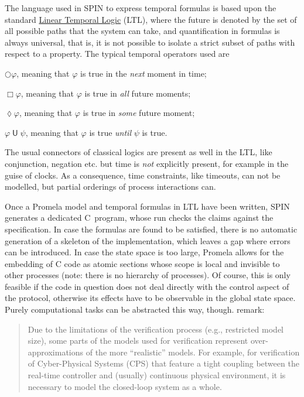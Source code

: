 \documentclass[a4paper,11pt,twoside]{article}
\newcommand\SPIN{\textsf{SPIN}\xspace}
\newcommand\Promela{\textsf{Promela}\xspace}
\newcommand\Clang{\textsf{C}\xspace}
\begin{document}
The language used in \SPIN to express temporal formulas is based upon
the standard
\href{http://en.wikipedia.org/wiki/Linear_temporal_logic}{Linear
  Temporal Logic} (LTL), where the future is denoted by the set of all
possible paths that the system can take, and quantification in
formulas is always universal, that is, it is not possible to isolate a
strict subset of paths with respect to a property. The typical
temporal operators used are
\begin{itemize*}

  \item $\bigcirc \varphi$, meaning that $\varphi$ is true in the
    \emph{next} moment in time;

  \item $\Box \varphi$, meaning that $\varphi$ is true in \emph{all}
    future moments;

  \item $\lozenge \varphi$, meaning that $\varphi$ is true in
    \emph{some} future moment;

  \item $\varphi \mathrel{\textsf{U}} \psi$, meaning that $\varphi$ is
    true \emph{until} $\psi$ is true.
 
\end{itemize*}
The usual connectors of classical logics are present as well in the
LTL, like conjunction, negation etc. but time is \emph{not} explicitly
present, for example in the guise of clocks. As a consequence, time
constraints, like timeouts, can not be modelled, but partial orderings
of process interactions can.

Once a \Promela model and temporal formulas in LTL have been written,
\SPIN generates a dedicated \Clang~program, whose run checks the
claims against the specification. In case the formulas are found to be
satisfied, there is no automatic generation of a skeleton of the
implementation, which leaves a gap where errors can be introduced. In
case the state space is too large, \Promela allows for the embedding
of \Clang code as atomic sections whose scope is local and invisible
to other processes (note: there is no hierarchy of processes). Of
course, this is only feasible if the code in question does not deal
directly with the control aspect of the protocol, otherwise its
effects have to be observable in the global state space. Purely
computational tasks can be abstracted this way,
though. \citet{PajicJiangLeeSokolskyMangharam:2012} remark: \blockquote{Due to the limitations of the verification
  process (e.g., restricted model size), some parts of the models used
  for verification represent over\hyp{}approximations of the more
  ``realistic'' models. For example, for verification of
  Cyber\hyp{}Physical Systems (CPS) that feature a tight coupling
  between the real\hyp{}time controller and (usually) continuous
  physical environment, it is necessary to model the closed-loop
  system as a whole.}
\end{document}

